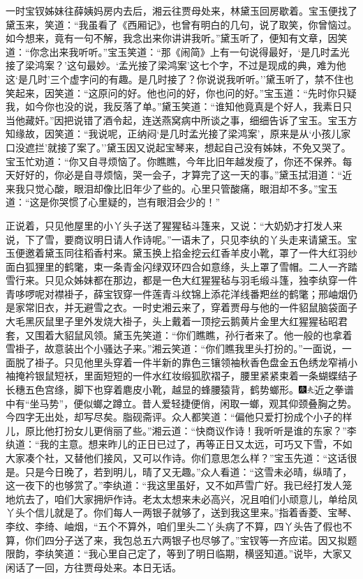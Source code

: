 一时宝钗姊妹往薛姨妈房内去后，湘云往贾母处来，林黛玉回房歇着。宝玉便找了黛玉来，笑道：``我虽看了《西厢记》，也曾有明白的几句，说了取笑，你曾恼过。如今想来，竟有一句不解，我念出来你讲讲我听。''黛玉听了，便知有文章，因笑道：``你念出来我听听。''宝玉笑道：``那《闹简》上有一句说得最好，`是几时孟光接了梁鸿案？'这句最妙。`孟光接了梁鸿案'这七个字，不过是现成的典，难为他这`是几时'三个虚字问的有趣。是几时接了？你说说我听听。''黛玉听了，禁不住也笑起来，因笑道：``这原问的好。他也问的好，你也问的好。''宝玉道：``先时你只疑我，如今你也没的说，我反落了单。''黛玉笑道：``谁知他竟真是个好人，我素日只当他藏奸。''因把说错了酒令起，连送燕窝病中所谈之事，细细告诉了宝玉。宝玉方知缘故，因笑道：``我说呢，正纳闷`是几时孟光接了梁鸿案'，原来是从`小孩儿家口没遮拦'就接了案了。''黛玉因又说起宝琴来，想起自己没有姊妹，不免又哭了。宝玉忙劝道：``你又自寻烦恼了。你瞧瞧，今年比旧年越发瘦了，你还不保养。每天好好的，你必是自寻烦恼，哭一会子，才算完了这一天的事。''黛玉拭泪道：``近来我只觉心酸，眼泪却像比旧年少了些的。心里只管酸痛，眼泪却不多。''宝玉道：``这是你哭惯了心里疑的，岂有眼泪会少的！''

正说着，只见他屋里的小丫头子送了猩猩毡斗篷来，又说：``大奶奶才打发人来说，下了雪，要商议明日请人作诗呢。''一语未了，只见李纨的丫头走来请黛玉。宝玉便邀着黛玉同往稻香村来。黛玉换上掐金挖云红香羊皮小靴，罩了一件大红羽纱面白狐狸里的鹤氅，束一条青金闪绿双环四合如意绦，头上罩了雪帽。二人一齐踏雪行来。只见众姊妹都在那边，都是一色大红猩猩毡与羽毛缎斗篷，独李纨穿一件青哆啰呢对襟褂子，薛宝钗穿一件莲青斗纹锦上添花洋线番羓丝的鹤氅；邢岫烟仍是家常旧衣，并无避雪之衣。一时史湘云来了，穿着贾母与他的一件貂鼠脑袋面子大毛黑灰鼠里子里外发烧大褂子，头上戴着一顶挖云鹅黄片金里大红猩猩毡昭君套，又围着大貂鼠风领。黛玉先笑道：``你们瞧瞧，孙行者来了。他一般的也拿着雪褂子，故意装出个小骚达子来。''湘云笑道：``你们瞧我里头打扮的。''一面说，一面脱了褂子。只见他里头穿着一件半新的靠色三镶领袖秋香色盘金五色绣龙窄褃小袖掩衿银鼠短袄，里面短短的一件水红妆缎狐肷褶子，腰里紧紧束着一条蝴蝶结子长穗五色宫绦，脚下也穿着麀皮小靴，越显的蜂腰猿背，鹤势螂形。{\includegraphics[width=3mm]{../Images/00004}\includegraphics[width=3mm]{../Images/00012}\footnotesize \kaishu 近之拳谱中有``坐马势''，便似螂之蹲立。昔人爱轻捷便俏，闲取一螂，观其仰颈叠胸之势。今四字无出处，却写尽矣。脂砚斋评。}众人都笑道：``偏他只爱打扮成个小子的样儿，原比他打扮女儿更俏丽了些。''湘云道：``快商议作诗！我听听是谁的东家？''李纨道：``我的主意。想来昨儿的正日已过了，再等正日又太远，可巧又下雪，不如大家凑个社，又替他们接风，又可以作诗。你们意思怎么样？''宝玉先道：``这话很是。只是今日晚了，若到明儿，晴了又无趣。''众人看道：``这雪未必晴，纵晴了，这一夜下的也够赏了。''李纨道：``我这里虽好，又不如芦雪广好。我已经打发人笼地炕去了，咱们大家拥炉作诗。老太太想来未必高兴，况且咱们小顽意儿，单给凤丫头个信儿就是了。你们每人一两银子就够了，送到我这里来。''指着香菱、宝琴、李纹、李绮、岫烟，``五个不算外，咱们里头二丫头病了不算，四丫头告了假也不算，你们四分子送了来，我包总五六两银子也尽够了。''宝钗等一齐应诺。因又拟题限韵，李纨笑道：``我心里自己定了，等到了明日临期，横竖知道。''说毕，大家又闲话了一回，方往贾母处来。本日无话。

